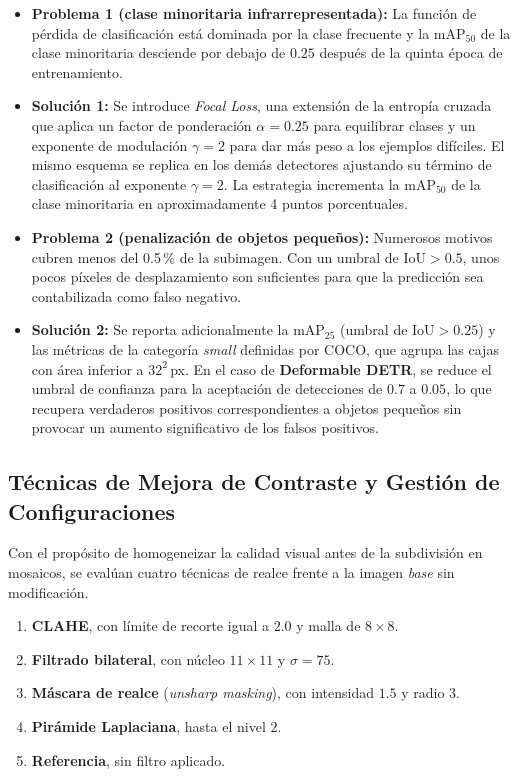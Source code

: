 \begin{itemize}
  \item \textbf{Problema 1 (clase minoritaria infrarrepresentada):}
        La función de pérdida de clasificación está dominada por la clase frecuente y la \(\text{mAP}_{50}\) de la clase minoritaria desciende por debajo de \(0.25\) después de la quinta época de entrenamiento.

  \item \textbf{Solución 1:}
        Se introduce \emph{Focal Loss}, una extensión de la entropía cruzada que aplica un factor de ponderación \(\alpha = 0.25\) para equilibrar clases y un exponente de modulación \(\gamma = 2\) para dar más peso a los ejemplos difíciles.
        El mismo esquema se replica en los demás detectores ajustando su término de clasificación al exponente \(\gamma = 2\).
        La estrategia incrementa la \(\text{mAP}_{50}\) de la clase minoritaria en aproximadamente 4 puntos porcentuales.

  \item \textbf{Problema 2 (penalización de objetos pequeños):}
        Numerosos motivos cubren menos del 0.5\,\% de la subimagen.
        Con un umbral de \(\text{IoU}>0.5\), unos pocos píxeles de desplazamiento son suficientes para que la predicción sea contabilizada como falso negativo.

  \item \textbf{Solución 2:}
        Se reporta adicionalmente la \(\text{mAP}_{25}\) (umbral de \(\text{IoU}>0.25\)) y las métricas de la categoría \emph{small} definidas por COCO, que agrupa las cajas con área inferior a \(32^{2}\)\,px.
        En el caso de \textbf{Deformable DETR}, se reduce el umbral de confianza para la aceptación de detecciones de \(0.7\) a \(0.05\), lo que recupera verdaderos positivos correspondientes a objetos pequeños sin provocar un aumento significativo de los falsos positivos.
\end{itemize}

\subsection{Técnicas de Mejora de Contraste y Gestión de Configuraciones}\label{ssec:contraste}

Con el propósito de homogeneizar la calidad visual antes de la subdivisión en mosaicos, se evalúan cuatro técnicas de realce frente a la imagen \emph{base} sin modificación.
\begin{enumerate}
  \renewcommand{\labelenumi}{\alph{enumi})}
  \renewcommand{\theenumi}{\alph{enumi}}
  \item \textbf{CLAHE}, con límite de recorte igual a \(2.0\) y malla de \(8\times8\).
  \item \textbf{Filtrado bilateral}, con núcleo \(11\times11\) y \(\sigma = 75\).
  \item \textbf{Máscara de realce} (\emph{unsharp masking}), con intensidad \(1.5\) y radio \(3\).
  \item \textbf{Pirámide Laplaciana}, hasta el nivel \(2\).
  \item \textbf{Referencia}, sin filtro aplicado.
\end{enumerate}

